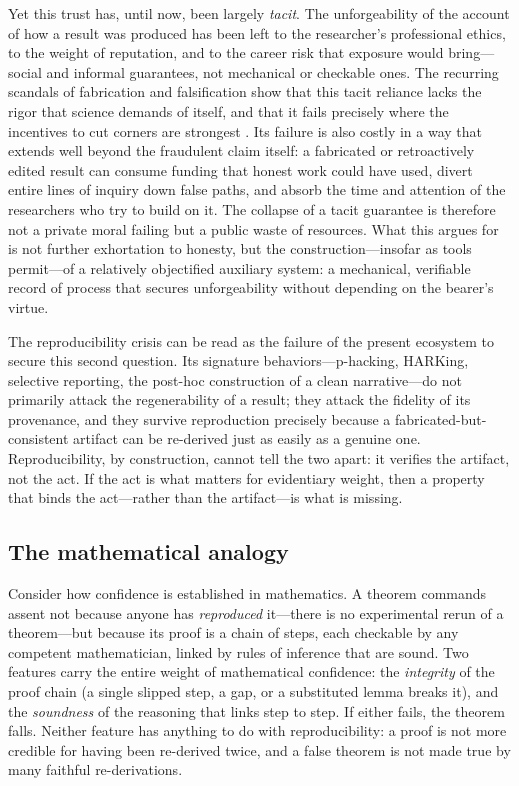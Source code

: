 \documentclass[11pt]{article}
\begin{document}
Yet this trust has, until now, been largely \emph{tacit}. The unforgeability of the
account of how a result was produced has been left to the researcher's professional
ethics, to the weight of reputation, and to the career risk that exposure would
bring---social and informal guarantees, not mechanical or checkable ones. The recurring
scandals of fabrication and falsification show that this tacit reliance lacks the rigor
that science demands of itself, and that it fails precisely where the incentives to cut
corners are strongest \parencite{fanelli2009}. Its failure is also costly in a way that
extends well beyond the fraudulent claim itself: a fabricated or retroactively edited
result can consume funding that honest work could have used, divert entire lines of
inquiry down false paths, and absorb the time and attention of the researchers who try
to build on it. The collapse of a tacit guarantee is therefore not a private moral
failing but a public waste of resources. What this argues for is not further exhortation
to honesty, but the construction---insofar as tools permit---of a relatively objectified
auxiliary system: a mechanical, verifiable record of process that secures unforgeability
without depending on the bearer's virtue.

The reproducibility crisis can be read as the failure of the present ecosystem to secure
this second question. Its signature behaviors---p-hacking, HARKing, selective reporting,
the post-hoc construction of a clean narrative---do not primarily attack the
regenerability of a result; they attack the fidelity of its provenance, and they survive
reproduction precisely because a fabricated-but-consistent artifact can be re-derived
just as easily as a genuine one. Reproducibility, by construction, cannot tell the two
apart: it verifies the artifact, not the act. If the act is what matters for evidentiary
weight, then a property that binds the act---rather than the artifact---is what is missing.

\subsection{The mathematical analogy}

Consider how confidence is established in mathematics. A theorem commands assent not
because anyone has \emph{reproduced} it---there is no experimental rerun of a
theorem---but because its proof is a chain of steps, each checkable by any competent
mathematician, linked by rules of inference that are sound. Two features carry the
entire weight of mathematical confidence: the \emph{integrity} of the proof chain (a
single slipped step, a gap, or a substituted lemma breaks it), and the \emph{soundness}
of the reasoning that links step to step. If either fails, the theorem falls. Neither
feature has anything to do with reproducibility: a proof is not more credible for
having been re-derived twice, and a false theorem is not made true by many faithful
re-derivations.
\end{document}
